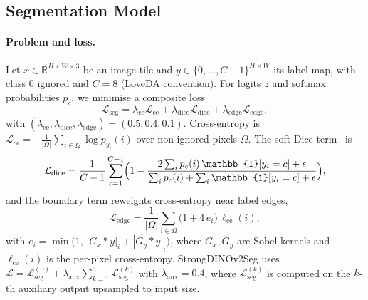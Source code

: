 \documentclass[journal]{IEEEtran}
\begin{document}
\subsection{Segmentation Model}

\paragraph{Problem and loss.}
Let $x\in\mathbb{R}^{H\times W\times 3}$ be an image tile and $y\in\{0,\dots,C-1\}^{H\times W}$ its label map, with class $0$ ignored and $C=8$ (LoveDA convention). For logits $z$ and softmax probabilities $p_c$, we minimise a composite loss
\begin{equation}
\mathcal{L}_{\mathrm{seg}} = \lambda_{\mathrm{ce}}\mathcal{L}_{\mathrm{ce}} + \lambda_{\mathrm{dice}}\mathcal{L}_{\mathrm{dice}} + \lambda_{\mathrm{edge}}\mathcal{L}_{\mathrm{edge}},
\label{eq:seg}
\end{equation}
with $(\lambda_{\mathrm{ce}},\lambda_{\mathrm{dice}},\lambda_{\mathrm{edge}})=(0.5,0.4,0.1)$. Cross-entropy is $\mathcal{L}_{\mathrm{ce}}=-\frac{1}{|\Omega|}\sum_{i\in\Omega}\log p_{y_i}(i)$ over non-ignored pixels $\Omega$. The soft Dice term~\cite{milletari2016vnet} is
\begin{equation}
\mathcal{L}_{\mathrm{dice}} = \frac{1}{C-1}\sum_{c=1}^{C-1}\Bigl(1-\frac{2\sum_i p_c(i)\,\mathbb{1}[y_i=c]+\epsilon}{\sum_i p_c(i)+\sum_i\mathbb{1}[y_i=c]+\epsilon}\Bigr),
\end{equation}
and the boundary term reweights cross-entropy near label edges,
\begin{equation}
\mathcal{L}_{\mathrm{edge}} = \frac{1}{|\Omega|}\sum_{i\in\Omega}\bigl(1+4\,e_i\bigr)\,\ell_{\mathrm{ce}}(i),
\end{equation}
with $e_i=\min\bigl(1,\,|G_x*y|_i+|G_y*y|_i\bigr)$, where $G_x,G_y$ are Sobel kernels and $\ell_{\mathrm{ce}}(i)$ is the per-pixel cross-entropy. StrongDINOv2Seg uses $\mathcal{L}=\mathcal{L}_{\mathrm{seg}}^{(0)}+\lambda_{\mathrm{aux}}\sum_{k=1}^{3}\mathcal{L}_{\mathrm{seg}}^{(k)}$ with $\lambda_{\mathrm{aux}}=0.4$, where $\mathcal{L}^{(k)}_{\mathrm{seg}}$ is computed on the $k$-th auxiliary output upsampled to input size.
\end{document}
